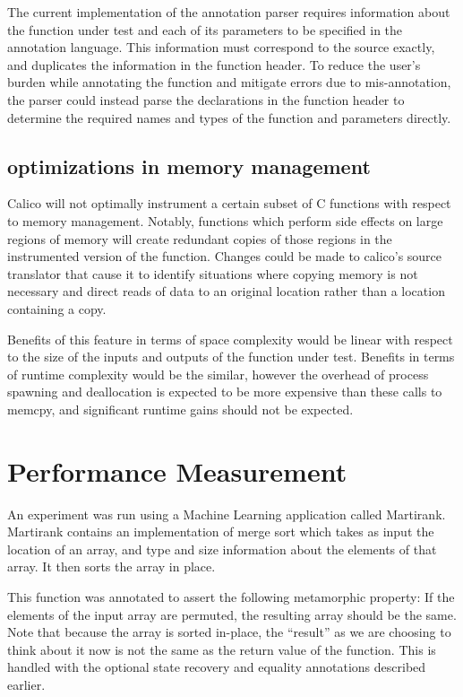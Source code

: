 \documentclass[notitlepage]{article}
\begin{document}
The current implementation of the annotation parser requires information about the function under test and each of its parameters to be specified in the annotation language. This information must correspond to the source exactly, and duplicates the information in the function header. To reduce the user's burden while annotating the function and mitigate errors due to mis-annotation, the parser could instead parse the declarations in the function header to determine the required names and types of the function and parameters directly.

\subsection{optimizations in memory management}

Calico will not optimally instrument a certain subset of C functions with respect to memory management. Notably, functions which perform side effects on large regions of memory will create redundant copies of those regions in the instrumented version of the function. Changes could be made to calico's source translator that cause it to identify situations where copying memory is not necessary and direct reads of data to an original location rather than a location containing a copy.

Benefits of this feature in terms of space complexity would be linear with respect to the size of the inputs and outputs of the function under test. Benefits in terms of runtime complexity would be the similar, however the overhead of process spawning and deallocation is expected to be more expensive than these calls to memcpy, and significant runtime gains should not be expected.

\section{Performance Measurement}

An experiment was run using a Machine Learning application called Martirank. Martirank contains an implementation of merge sort which takes as input the location of an array, and type and size information about the elements of that array. It then sorts the array in place.

This function was annotated to assert the following metamorphic property: If the elements of the input array are permuted, the resulting array should be the same. Note that because the array is sorted in-place, the ``result'' as we are choosing to think about it now is not the same as the return value of the function. This is handled with the optional state recovery and equality annotations described earlier.
\end{document}
